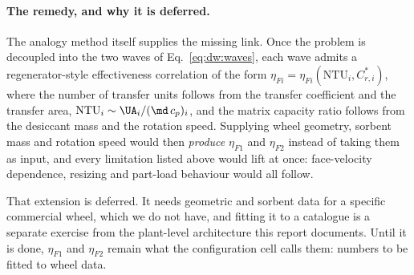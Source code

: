 \paragraph{The remedy, and why it is deferred.} The analogy method itself
supplies the missing link. Once the problem is decoupled into the two waves of
Eq.~\eqref{eq:dw:waves}, each wave admits a regenerator-style effectiveness
correlation of the form $\eta_{Fi} = \eta_{Fi}(\mathrm{NTU}_i,
C_{r,i}^{*})$, where the number of transfer units follows from the transfer
coefficient and the transfer area, $\mathrm{NTU}_i \sim \UA_i/(\md\,c_p)_i$,
and the matrix capacity ratio follows from the desiccant mass and the
rotation speed. Supplying wheel geometry, sorbent mass and rotation speed
would then \emph{produce} $\eta_{F1}$ and $\eta_{F2}$ instead of taking them
as input, and every limitation listed above would lift at once: face-velocity
dependence, resizing and part-load behaviour would all follow.

That extension is deferred. It needs geometric and sorbent data for a specific
commercial wheel, which we do not have, and fitting it to a catalogue is a
separate exercise from the plant-level architecture this report documents.
Until it is done, $\eta_{F1}$ and $\eta_{F2}$ remain what the configuration
cell calls them: numbers to be fitted to wheel data.
